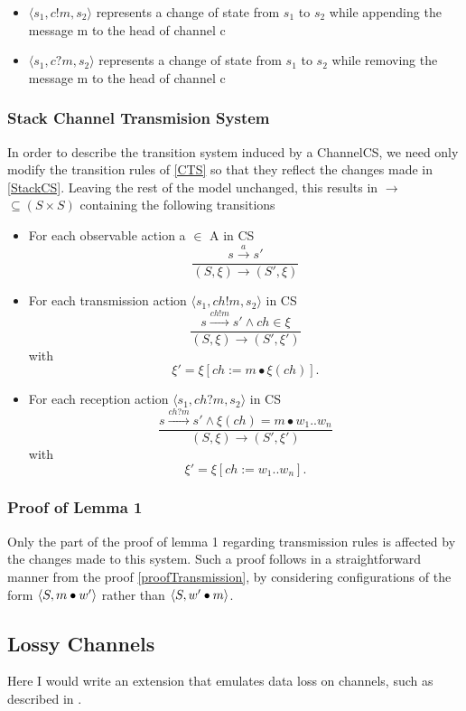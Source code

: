 \begin{itemize}
\item[]
$\langle s_1, c!m, s_2\rangle$ represents a change of state from $s_1$ to $s_2$ while appending the message m to the head of channel c
\item[]
$\langle s_1, c?m, s_2\rangle$ represents a change of state from $s_1$ to $s_2$ while removing the message m to the head of channel c
\end{itemize}

\subsubsection{Stack Channel Transmision System}
In order to describe the transition system induced by a ChannelCS, we need only modify the transition rules of \ref{CTS} so that they reflect the changes made in \ref{StackCS}. Leaving the rest of the model unchanged, this results in $\rightarrow$ $\subseteq (S \times S)$ containing the following transitions
\begin{itemize}
    \item
      For each observable action a $\in$ A in CS
      \[
      \dfrac{s \xrightarrow{a} s'}{(S, \xi) \rightarrow (S', \xi)}
      \]
    \item
      For each transmission action $\langle s_1, ch!m, s_2 \rangle$ in CS
      \[
      \dfrac{s \xrightarrow{ch!m} s' \wedge ch \in \xi}{(S, \xi) \rightarrow (S', \xi')} \] with \[ \xi' = \xi[ch := m \bullet \xi (ch)].
      \]
    \item
      For each reception action $\langle s_1, ch?m, s_2 \rangle$ in CS
      \[
      \dfrac{s \xrightarrow{ch?m} s' \wedge \xi(ch) = m \bullet w_1..w_n}{(S, \xi) \rightarrow (S', \xi')} \] with \[ \xi' = \xi[ch:= w_1..w_n].
      \]
  \end{itemize}

\subsubsection{Proof of Lemma 1}
Only the part of the proof of lemma 1 regarding transmission rules is affected by the changes made to this system. Such a proof follows in a straightforward manner from the proof \ref{proofTransmission}, by considering configurations of the form  $\langle S, m\bullet w'\rangle$ rather than $\langle S, w'\bullet m\rangle$.

\subsection{Lossy Channels}
Here I would write an extension that emulates data loss on channels, such as described in \cite{287591}.
